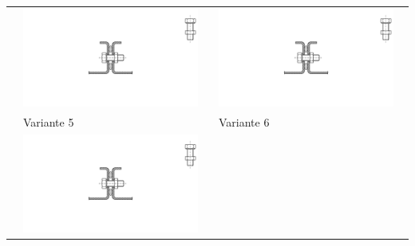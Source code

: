 \begin{longtable}{l p{6.55cm} p{6.55cm}}
         & \noindent\begin{minipage}{6.5cm}
                \includegraphics[page=11, width=0.95\textwidth, trim = 12.5cm 7.5cm 9.5cm 6.5cm, clip]{Abbildungen/Kapitel3/Konzepte.pdf}
        \end{minipage} &
        \noindent\begin{minipage}{6.5cm}
                \includegraphics[page=12, width=0.95\textwidth, trim = 12.5cm 6.5cm 11.5cm 7cm, clip]{Abbildungen/Kapitel3/Konzepte.pdf}
        \end{minipage} \\
         & Variante 5 & Variante 6  \\ \nopagebreak
         & \noindent\begin{minipage}{6.5cm}
                \includegraphics[page=13, width=0.95\textwidth, trim = 10.5cm 8cm 12.5cm 5cm, clip]{Abbildungen/Kapitel3/Konzepte.pdf}

\end{minipage}
\end{longtable}
